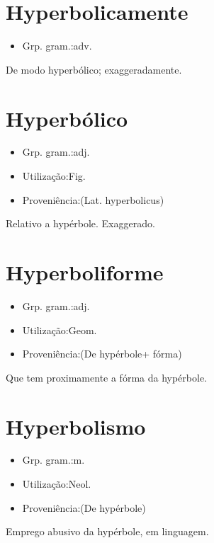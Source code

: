 \documentclass{article}
\begin{document}
\section{Hyperbolicamente}
\begin{itemize}
\item {Grp. gram.:adv.}
\end{itemize}
De modo hyperbólico; exaggeradamente.
\section{Hyperbólico}
\begin{itemize}
\item {Grp. gram.:adj.}
\end{itemize}
\begin{itemize}
\item {Utilização:Fig.}
\end{itemize}
\begin{itemize}
\item {Proveniência:(Lat. \textunderscore hyperbolicus\textunderscore )}
\end{itemize}
Relativo a hypérbole.
Exaggerado.
\section{Hyperboliforme}
\begin{itemize}
\item {Grp. gram.:adj.}
\end{itemize}
\begin{itemize}
\item {Utilização:Geom.}
\end{itemize}
\begin{itemize}
\item {Proveniência:(De \textunderscore hypérbole\textunderscore  + \textunderscore fórma\textunderscore )}
\end{itemize}
Que tem proximamente a fórma da hypérbole.
\section{Hyperbolismo}
\begin{itemize}
\item {Grp. gram.:m.}
\end{itemize}
\begin{itemize}
\item {Utilização:Neol.}
\end{itemize}
\begin{itemize}
\item {Proveniência:(De \textunderscore hypérbole\textunderscore )}
\end{itemize}
Emprego abusivo da hypérbole, em linguagem.
\end{document}
